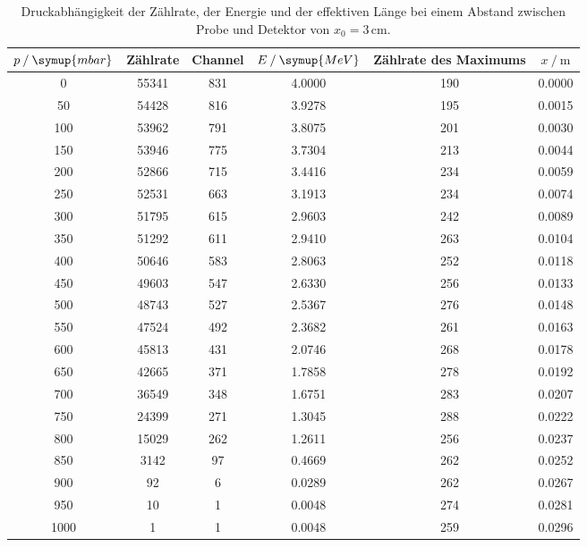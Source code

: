 \begin{table}
    \centering
    \caption{Druckabhängigkeit der Zählrate, der Energie und der effektiven Länge bei einem Abstand zwischen Probe und Detektor von $x_0 = 3\,\unit{\cm}$.}
\begin{tabular}{c c c c c c}
    \toprule
    $p \mathbin{/}\symup{mbar}$ &Zählrate& Channel & $E \mathbin{/}\symup{MeV}$ & Zählrate des Maximums & $x \mathbin{/}\unit{\m}$ \\
    \midrule
    0&55341&831&4.0000&190&0.0000 \\
    50&54428&816&3.9278&195&0.0015 \\
    100&53962&791&3.8075&201&0.0030\\
    150&53946&775&3.7304&213&0.0044\\
    200&52866&715&3.4416&234&0.0059\\
    250&52531&663&3.1913&234&0.0074\\
    300&51795&615&2.9603&242&0.0089\\
    350&51292&611&2.9410&263&0.0104\\
    400&50646&583&2.8063&252&0.0118\\
    450&49603&547&2.6330&256&0.0133\\
    500&48743&527&2.5367&276&0.0148\\
    550&47524&492&2.3682&261&0.0163\\
    600&45813&431&2.0746&268&0.0178\\
    650&42665&371&1.7858&278&0.0192\\
    700&36549&348&1.6751&283&0.0207\\
    750&24399&271&1.3045&288&0.0222\\
    800&15029&262&1.2611&256&0.0237\\
    850&3142&97&0.4669&262&0.0252\\
    900&92&6&0.0289&262&0.0267\\
    950&10&1&0.0048&274&0.0281\\
    1000&1&1&0.0048&259&0.0296\\
    \bottomrule
    \end{tabular}
    \label{tab:3cm}
\end{table}

